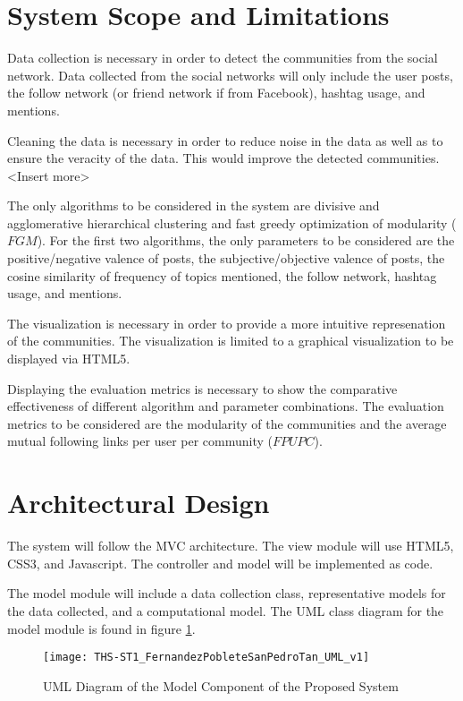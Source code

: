 \section{System Scope and Limitations}
Data collection is necessary in order to detect the communities from the social network.
Data collected from the social networks will only include the user posts, the follow network (or friend network if from Facebook),
hashtag usage, and mentions.

Cleaning the data is necessary in order to reduce noise in the data as well as to ensure the veracity of the data. This 
would improve the detected communities. \textless Insert more\textgreater

The only algorithms to be considered in the system are divisive and agglomerative hierarchical clustering and fast greedy optimization
of modularity ($FGM$). For the first two algorithms, the only parameters to be considered are the positive/negative valence of posts, 
the subjective/objective valence of posts, the cosine similarity of frequency of topics mentioned, the follow network, hashtag usage,
and mentions.

The visualization is necessary in order to provide a more intuitive represenation of the communities. The visualization is limited to 
a graphical visualization to be displayed via HTML5.

Displaying the evaluation metrics is necessary to show the comparative effectiveness of different algorithm and parameter combinations.
The evaluation metrics to be considered are the modularity of the communities and the average mutual following links per user per community
($FPUPC$).


\section{Architectural Design}
The system will follow the MVC architecture. The view module will use HTML5, CSS3, and Javascript. The 
controller and model will be implemented as code.

The model module will include a data collection class, representative models for the data collected, and a computational model.
The UML class diagram for the model module is found in figure \ref{fig:uml}.

\newpage

\begin{landscape}
\begin{figure}
	\centering
	\texttt{[image: THS-ST1\_FernandezPobleteSanPedroTan\_UML\_v1]}
	\caption{UML Diagram of the Model Component of the Proposed System}
	\label{fig:uml}	
\end{figure}
\end{landscape}

